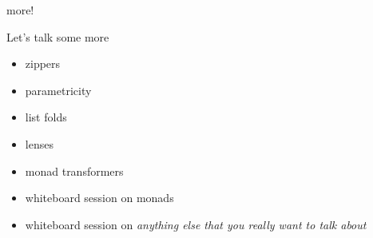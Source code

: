 \begin{frame}
\begin{block}{more!}
\begin{center}
Let's talk some more
\begin{itemize}
  \item zippers
  \item parametricity
  \item list folds
  \item lenses
  \item monad transformers
  \item whiteboard session on monads
  \item whiteboard session on \emph{anything else that you really want to talk about}
\end{itemize}
\end{center}
\end{block}
\end{frame}
